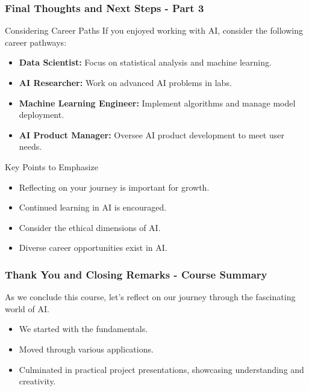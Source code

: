 \documentclass[aspectratio=169]{beamer}
\begin{document}
\begin{frame}[fragile]
    \frametitle{Final Thoughts and Next Steps - Part 3}
    \begin{block}{Considering Career Paths}
        If you enjoyed working with AI, consider the following career pathways:
    \end{block}
    \begin{itemize}
        \item \textbf{Data Scientist:}  
            Focus on statistical analysis and machine learning.

        \item \textbf{AI Researcher:}  
            Work on advanced AI problems in labs.

        \item \textbf{Machine Learning Engineer:}  
            Implement algorithms and manage model deployment.

        \item \textbf{AI Product Manager:}  
            Oversee AI product development to meet user needs.
    \end{itemize}
    \begin{block}{Key Points to Emphasize}
        \begin{itemize}
            \item Reflecting on your journey is important for growth.
            \item Continued learning in AI is encouraged.
            \item Consider the ethical dimensions of AI.
            \item Diverse career opportunities exist in AI.
        \end{itemize}
    \end{block}
\end{frame}

\begin{frame}[fragile]
    \frametitle{Thank You and Closing Remarks - Course Summary}
    As we conclude this course, let's reflect on our journey through the fascinating world of AI.
    \begin{itemize}
        \item We started with the fundamentals.
        \item Moved through various applications.
        \item Culminated in practical project presentations, showcasing understanding and creativity.
    \end{itemize}
\end{frame}
\end{document}

